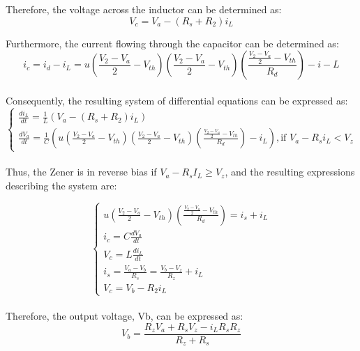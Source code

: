 Therefore, the voltage across the inductor can be determined as:\\

\begin{equation}
    V_c=V_a-(R_s+R_2)i_L
\end{equation}

Furthermore, the current flowing through the capacitor can be determined as:\\

\begin{equation}
    i_c=i_d-i_L=u(\frac{V_2-V_a}{2}-V_{th})(\frac{V_2-V_a}{2}-V_{th})(\frac{\frac{V_2-V_a}{2}-V_{th}}{R_d})-i-L
\end{equation}\\

Consequently, the resulting system of differential equations can be expressed as:\\

\begin{equation}
    \begin{cases}
        \frac{di_L}{dt}=\frac{1}{L}(V_a-(R_s+R_2)i_L)\\
        \frac{dV_a}{dt}=\frac{1}{C}\left(u\left(\frac{V_2-V_a}{2}-V_{th}\right)\left(\frac{V_2-V_a}{2}-V_{th}\right)\left(\frac{\frac{V_2-V_a}{2}-V_{th}}{R_d}\right)-i_L\right), \text{if } V_a-R_si_L<V_z
    \end{cases}
\end{equation}\\

Thus, the Zener is in reverse bias if $V_a - R_sI_L \geq V_z$, and the resulting expressions describing the system are:

\begin{equation}
    \begin{cases}
        u(\frac{V_2-V_a}{2}-V_{th})(\frac{\frac{V_2-V_a}{2}-V_{th}}{R_d})=i_s+i_L\\
        i_c=C\frac{dV_a}{dt}\\
        V_c=L\frac{di_L}{dt}\\
        i_s=\frac{V_a-V_b}{R_s}=\frac{V_b-V_z}{R_z}+i_L\\
        V_c=V_b-R_2i_L
    \end{cases}
\end{equation}\\

Therefore, the output voltage, Vb, can be expressed as:\\

\begin{equation}
    V_b=\frac{R_zV_a+R_sV_z-i_LR_sR_z}{R_z+R_s}
\end{equation}\\

